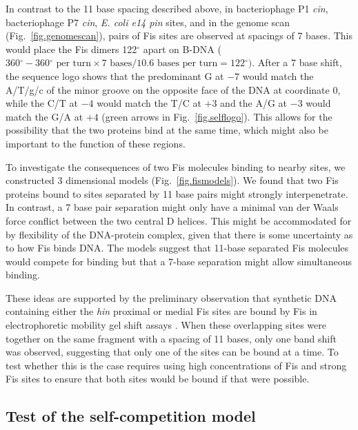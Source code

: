 \documentclass[doublespacing]{narfront}
\newcommand{\fig}[1]{Fig.~\ref{#1}} %
\newcommand{\figmargin}[1]{\marginpar{\textcolor{blue}{$\Leftarrow$Fig \ref{#1}}}}
\newcommand{\degrees}{${}^{\circ}$}
\begin{document}
In contrast to the 11 base spacing described above,
in bacteriophage P1 \emph{cin},
bacteriophage P7 \emph{cin},
\emph{E. coli e14 pin} sites,
and in the genome scan
(\fig{fig.genomescan}),
pairs of Fis sites are observed at spacings of
7 bases.
This would place the Fis dimers
122\degrees\/
apart on B-DNA
($ 360\mbox{\degrees} - 
360\mbox{\degrees}
\mbox{ per turn}
\times 7 \mbox{ bases}
/
10.6 \mbox{ bases per turn}
= 122\mbox{\degrees}
) $.
After a 7 base shift, the sequence logo shows
that the predominant G at $-7$ would match the A/T/g/c
of the minor groove on the opposite
face of the DNA at coordinate 0, while the C/T at $-4$ would match the T/C at
$+3$ and the A/G at $-3$ would match the G/A at $+4$
(green arrows in \fig{fig.selflogo}).
This allows for the possibility that the
two proteins bind at the same time,
which might also be important to the
function of these regions.

To investigate the consequences of two Fis
molecules binding to nearby sites,
we constructed 3 dimensional models
(\fig{fig.fismodels}).\figmargin{fig.fismodels}
We found that two Fis proteins
bound to sites separated by 11 base pairs might strongly interpenetrate.
In contrast, a 7 base pair separation might only have a
minimal van der Waals force conflict between the two central D helices.
This might be accommodated for by flexibility
of the DNA-protein complex,
given that
there is some uncertainty as to how Fis binds DNA.
The models suggest
that 11-base separated Fis
molecules would compete for binding but that a
7-base separation might allow
simultaneous binding.

These ideas are supported by the
preliminary observation that
synthetic DNA containing either
the \emph{hin} proximal or medial Fis sites
are bound by Fis in
electrophoretic mobility gel shift assays
\cite{Hengen.fisinfo}.
When these overlapping sites
were together on the same fragment
with a spacing of 11 bases,
only one band shift was observed,
suggesting that only one of the sites can
be bound at a time.
To test whether this is the case
requires using high concentrations of Fis
and strong Fis sites to ensure that both sites
would be bound if that were possible.

\subsection*{Test of the self-competition model}
\end{document}
